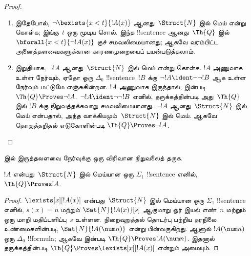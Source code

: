 \documentclass[../../../include/open-logic-section]{subfiles}
\begin{document}
\begin{proof}
\begin{enumerate}
இருத்தலளவைகளுக்கான காரணமுறையைப் பயன்படுத்தலாம்.
%
\item இதேபோல்,
$\lnot \bexists{x<t}{!A(x)}$ ஆனது~$\Struct{N}$ இல் மெய் என்று கொள்க;
இங்கு~$t$ ஒரு மூடிய சொல். இந்த !!{sentence} ஆனது~$\Th{Q}$ இல்
$\bforall{x<t}{\lnot!A(x)}$ குச் சமவலிமையானது; ஆகவே வரம்பிட்ட
அனைத்தளவைகளுக்கான காரணமுறையைப் பயன்படுத்தலாம்.
%
\item இறுதியாக, $\lnot !A$ ஆனது~$\Struct{N}$ இல் மெய் என்று கொள்க.
$!A$ அணுவாக உள்ள நேர்வும், ஏதோ ஒரு $\Delta_0$ !!{sentence}~$!B$ க்கு
$\lnot !A \ident \lnot\lnot !B$ ஆக உள்ள நேர்வும் மட்டுமே எஞ்சுகின்றன.
$!A$ அணுவாக இருந்தால்,  இன்படி
$\Th{Q} \Proves \lnot !A$.
$\lnot !A \ident \lnot\lnot !B$ எனில், தருக்கத்தின்படி அது~$\Th{Q}$ இல்
$!B$ க்கு நிறுவத்தக்கவாறு சமவலிமையானது. $\lnot !A$ ஆனது~$\Struct{N}$ இல்
மெய் என்பதால், அந்த வாக்கியமும்~$\Struct{N}$ இல் மெய். ஆகவே தொகுத்தறிதல்
எடுகோளின்படி $\Th{Q} \Proves \lnot !A$.
\end{enumerate}
\end{proof}

\begin{prob}
 இல் இருத்தலளவை நேர்வுக்கு ஒரு விரிவான
நிறுவலைத் தருக.
\end{prob}

\begin{thm}
$!A$ என்பது~$\Struct{N}$ இல் மெய்யான ஒரு $\Sigma_1$ !!{sentence} எனில்,
$\Th{Q} \Proves !A$.
\end{thm}

\begin{proof}
$\lexists[x][!A(x)]$ என்பது~$\Struct{N}$ இல் மெய்யான ஒரு
$\Sigma_1$ !!{sentence} எனில், $s(x) = n$ மற்றும்
$\Sat{N}{!A(x)}[s]$ ஆகுமாறு ஓர் இயல் எண்~$n$ மற்றும் ஒரு மாறி
மதிப்பளிப்பு~$s$ உள்ளன. நிறைவுறுத்தல் தொடர்பு பற்றிய தரநிலை உண்மைகளின்படி,
$\Sat{N}{!A(\num n)}$ என்று பின்வருகிறது. ஆனால் $!A(\num n)$ ஒரு
$\Delta_0$ !!{formula}; ஆகவே  இன்படி
$\Th{Q} \Proves !A(\num n)$. இதனால் தருக்கத்தின்படி
$\Th{Q} \Proves \lexists[x][!A(x)]$ என்றும் அமையும்.
\end{proof}
\end{document}
